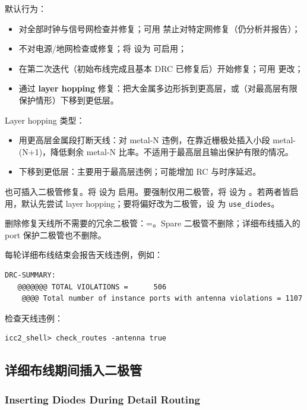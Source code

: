 默认行为：
\begin{itemize}
  \item 对全部时钟与信号网检查并修复；可用  禁止对特定网修复（仍分析并报告）；
  \item 不对电源/地网检查或修复；将  设为  可启用；
  \item 在第二次迭代（初始布线完成且基本 DRC 已修复后）开始修复；可用  更改；
  \item 通过 \textbf{layer hopping} 修复：把大金属多边形拆到更高层，或（对最高层有限保护情形）下移到更低层。
\end{itemize}

Layer hopping 类型：
\begin{itemize}
  \item 用更高层金属段打断天线：对 metal-N 违例，在靠近栅极处插入小段 metal-(N+1)，降低剩余 metal-N 比率。不适用于最高层且输出保护有限的情况。
  \item 下移到更低层：主要用于最高层违例；可能增加 RC 与时序延迟。
\end{itemize}

也可插入二极管修复。将  设为  启用。要强制仅用二极管，将  设为 。若两者皆启用，默认先尝试 layer hopping；要将偏好改为二极管，设  为 \texttt{use\_diodes}。

删除修复天线所不需要的冗余二极管：=。Spare 二极管不删除；详细布线插入的 port 保护二极管也不删除。

每轮详细布线结束会报告天线违例，例如：
\begin{lstlisting}
DRC-SUMMARY:
   @@@@@@@ TOTAL VIOLATIONS =      506
    @@@@ Total number of instance ports with antenna violations = 1107
\end{lstlisting}

检查天线违例：
\begin{lstlisting}
icc2_shell> check_routes -antenna true
\end{lstlisting}

\subsection{详细布线期间插入二极管}
\subsubsection*{Inserting Diodes During Detail Routing}

